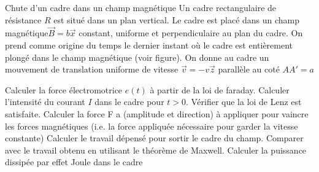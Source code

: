 \begin{Exercise}[title=Chute d'un cadre dans un champ magnétique]
Chute d’un cadre dans un champ magnétique Un cadre rectangulaire de résistance $R$
est situé dans un plan vertical. Le cadre est placé dans un champ magnétique$\vec{B}=b\vec{x}$ constant, uniforme et perpendiculaire au plan du cadre. On prend comme origine du temps le dernier instant où le cadre est entièrement plongé dans le champ magnétique
(voir figure). On donne au cadre un mouvement de translation uniforme de vitesse $\vec{v}=-v\vec{z}$ parallèle au coté $AA'=a$
\begin{center}
\end{center}
\Question Calculer la force électromotrice $e(t)$ à partir de la loi de faraday.
\Question Calculer l’intensité du courant $I$ dans le cadre pour $t > 0$. Vérifier que la loi de Lenz est satisfaite.
\Question Calculer la force F a (amplitude et direction) à appliquer pour vaincre les forces magnétiques (i.e. la force appliquée nécessaire pour garder la vitesse constante)
\Question Calculer le travail dépensé pour sortir le cadre du champ. Comparer avec le travail obtenu en utilisant le théorème de Maxwell.
\Question Calculer la puissance dissipée par effet Joule dans le cadre


\end{Exercise}

